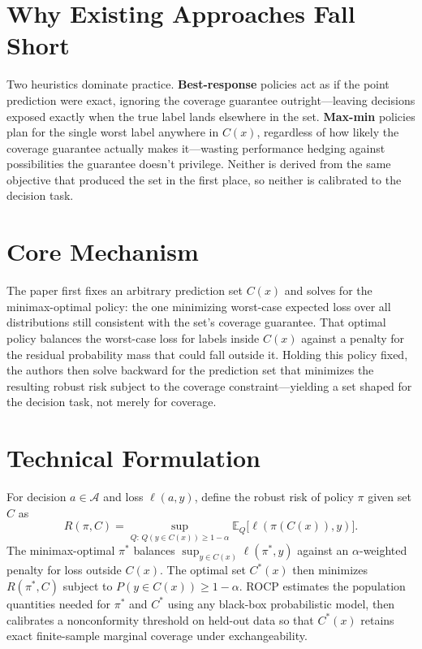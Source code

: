 \documentclass[10pt,twocolumn]{article}
\begin{document}
\section{Why Existing Approaches Fall Short}

Two heuristics dominate practice. \textbf{Best-response} policies act as
if the point prediction were exact, ignoring the coverage guarantee
outright---leaving decisions exposed exactly when the true label lands
elsewhere in the set. \textbf{Max-min} policies plan for the single
worst label anywhere in $C(x)$, regardless of how likely the coverage
guarantee actually makes it---wasting performance hedging against
possibilities the guarantee doesn't privilege. Neither is derived from
the same objective that produced the set in the first place, so neither
is calibrated to the decision task.

\section{Core Mechanism}

The paper first fixes an arbitrary prediction set $C(x)$ and solves for
the minimax-optimal policy: the one minimizing worst-case expected loss
over all distributions still consistent with the set's coverage
guarantee. That optimal policy balances the worst-case loss for labels
inside $C(x)$ against a penalty for the residual probability mass that
could fall outside it. Holding this policy fixed, the authors then solve
backward for the prediction set that minimizes the resulting robust risk
subject to the coverage constraint---yielding a set shaped for the
decision task, not merely for coverage.

\section{Technical Formulation}

For decision $a \in \mathcal{A}$ and loss $\ell(a,y)$, define the robust
risk of policy $\pi$ given set $C$ as
\[
R(\pi, C) = \sup_{Q:\, Q(y \in C(x)) \ge 1-\alpha}
  \mathbb{E}_Q\big[\ell(\pi(C(x)), y)\big].
\]
The minimax-optimal $\pi^{\ast}$ balances
$\sup_{y \in C(x)} \ell(\pi^{\ast}, y)$ against an $\alpha$-weighted
penalty for loss outside $C(x)$. The optimal set $C^{\ast}(x)$ then
minimizes $R(\pi^{\ast}, C)$ subject to $P(y \in C(x)) \ge 1-\alpha$.
ROCP estimates the population quantities needed for $\pi^{\ast}$ and
$C^{\ast}$ using any black-box probabilistic model, then calibrates a
nonconformity threshold on held-out data so that $C^{\ast}(x)$ retains
exact finite-sample marginal coverage under exchangeability.
\end{document}
